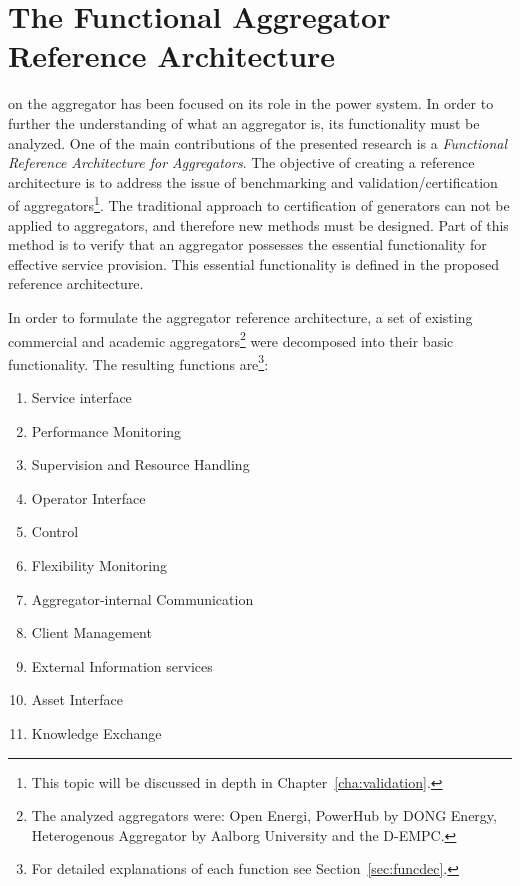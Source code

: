 \section{The Functional Aggregator Reference Architecture}\label{sec:MAINaggrefarch}
 on the aggregator has been focused on its role in the power system. In order to further the understanding of what an aggregator is, its functionality must be analyzed. One of the main contributions of the presented research is a \emph{Functional Reference Architecture for Aggregators}. The objective of creating a reference architecture is to address the issue of benchmarking and validation/certification of aggregators\footnote{This topic will be discussed in depth in Chapter~\ref{cha:validation}.}. The traditional approach to certification of generators can not be applied to aggregators, and therefore new methods must be designed. Part of this method is to verify that an aggregator possesses the essential functionality for effective service provision. This essential functionality is defined in the proposed reference architecture.

In order to formulate the aggregator reference architecture, a set of existing commercial and academic aggregators\footnote{The analyzed aggregators were: Open Energi\cite{openenergi}, PowerHub by DONG Energy\cite{powerhub}, Heterogenous Aggregator by Aalborg University\cite{rahnama2014evaluation} and the D-EMPC\cite{costanzo2013coordination}.}  were decomposed into their basic functionality. The resulting functions are\footnote{For detailed explanations of each function see Section~\ref{sec:funcdec}.}:

\begin{enumerate}[label=\Alph*]
	\item Service interface
	\item Performance Monitoring
	\item Supervision and Resource Handling
	\item Operator Interface
	\item Control
	\item Flexibility Monitoring
	\item Aggregator-internal Communication
	\item Client Management
	\item External Information services
	\item Asset Interface
	\item Knowledge Exchange
\end{enumerate}

